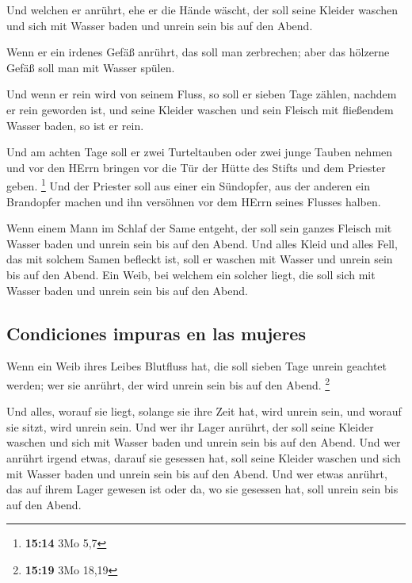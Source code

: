  Und welchen er anrührt, ehe er die Hände wäscht, der
soll seine Kleider waschen und sich mit Wasser baden und unrein sein bis
auf den Abend.

 Wenn er ein irdenes Gefäß anrührt, das soll man
zerbrechen; aber das hölzerne Gefäß soll man mit Wasser spülen.

 Und wenn er rein wird von seinem Fluss, so soll er
sieben Tage zählen, nachdem er rein geworden ist, und seine Kleider
waschen und sein Fleisch mit fließendem Wasser baden, so ist er rein.

 Und am achten Tage soll er zwei Turteltauben oder zwei
junge Tauben nehmen und vor den HErrn bringen vor die Tür der Hütte des
Stifts und dem Priester geben. \footnote{\textbf{15:14} 3Mo 5,7}
 Und der Priester soll aus einer ein Sündopfer, aus der
anderen ein Brandopfer machen und ihn versöhnen vor dem HErrn seines
Flusses halben.

 Wenn einem Mann im Schlaf der Same entgeht, der soll
sein ganzes Fleisch mit Wasser baden und unrein sein bis auf den Abend.
 Und alles Kleid und alles Fell, das mit solchem Samen
befleckt ist, soll er waschen mit Wasser und unrein sein bis auf den
Abend.  Ein Weib, bei welchem ein solcher liegt, die soll
sich mit Wasser baden und unrein sein bis auf den Abend.

\hypertarget{condiciones-impuras-en-las-mujeres}{%
\subsection{Condiciones impuras en las
mujeres}\label{condiciones-impuras-en-las-mujeres}}

 Wenn ein Weib ihres Leibes Blutfluss hat, die soll
sieben Tage unrein geachtet werden; wer sie anrührt, der wird unrein
sein bis auf den Abend. \footnote{\textbf{15:19} 3Mo 18,19}

 Und alles, worauf sie liegt, solange sie ihre Zeit hat,
wird unrein sein, und worauf sie sitzt, wird unrein sein.
 Und wer ihr Lager anrührt, der soll seine Kleider
waschen und sich mit Wasser baden und unrein sein bis auf den Abend.
 Und wer anrührt irgend etwas, darauf sie gesessen hat,
soll seine Kleider waschen und sich mit Wasser baden und unrein sein bis
auf den Abend.  Und wer etwas anrührt, das auf ihrem
Lager gewesen ist oder da, wo sie gesessen hat, soll unrein sein bis auf
den Abend.

